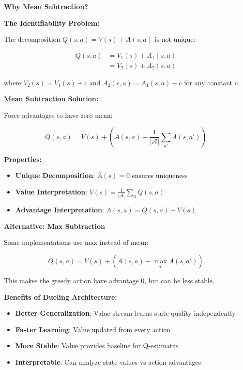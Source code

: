 \documentclass[12pt]{article}
\begin{document}
{{\textbf{Why Mean Subtraction?}

\textbf{The Identifiability Problem:}

The decomposition $Q(s,a) = V(s) + A(s,a)$ is not unique:

\begin{align}
Q(s,a) &= V_1(s) + A_1(s,a) \\
&= V_2(s) + A_2(s,a)
\end{align}

where $V_2(s) = V_1(s) + c$ and $A_2(s,a) = A_1(s,a) - c$ for any constant $c$.

\textbf{Mean Subtraction Solution:}

Force advantages to have zero mean:

\begin{equation}
Q(s,a) = V(s) + \left(A(s,a) - \frac{1}{|\mathcal{A}|}\sum_{a'} A(s,a')\right)
\end{equation}

\textbf{Properties:}
\begin{itemize}
\item \textbf{Unique Decomposition}: $\bar{A}(s) = 0$ ensures uniqueness
\item \textbf{Value Interpretation}: $V(s) = \frac{1}{|\mathcal{A}|}\sum_a Q(s,a)$
\item \textbf{Advantage Interpretation}: $A(s,a) = Q(s,a) - V(s)$
\end{itemize}

\textbf{Alternative: Max Subtraction}

Some implementations use max instead of mean:

\begin{equation}
Q(s,a) = V(s) + \left(A(s,a) - \max_{a'} A(s,a')\right)
\end{equation}

This makes the greedy action have advantage 0, but can be less stable.

\textbf{Benefits of Dueling Architecture:}
\begin{itemize}
\item \textbf{Better Generalization}: Value stream learns state quality independently
\item \textbf{Faster Learning}: Value updated from every action
\item \textbf{More Stable}: Value provides baseline for Q-estimates
\item \textbf{Interpretable}: Can analyze state values vs action advantages
\end{itemize}

}}
\end{document}
